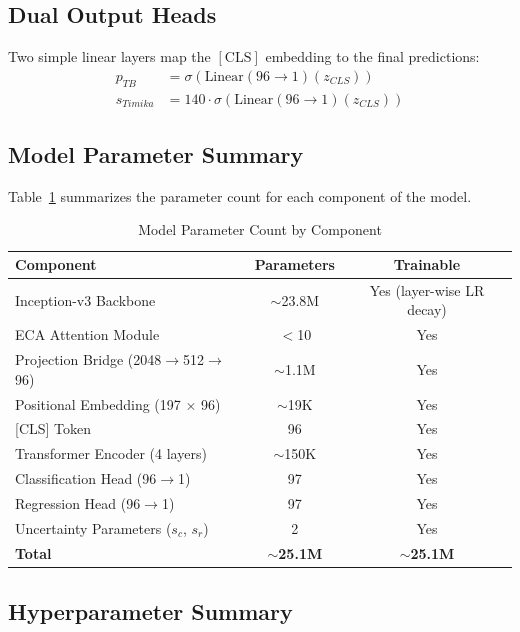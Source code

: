 \documentclass[12pt]{report}
\begin{document}
\subsection{Dual Output Heads}
Two simple linear layers map the $[\text{CLS}]$ embedding to the final predictions:
\begin{align}
p_{TB} &= \sigma(\text{Linear}(96 \to 1)(z_{CLS})) \\
s_{Timika} &= 140 \cdot \sigma(\text{Linear}(96 \to 1)(z_{CLS}))
\end{align}

\subsection{Model Parameter Summary}

Table~\ref{tab:params} summarizes the parameter count for each component of the model.

\begin{table}[H]
\centering
\caption{Model Parameter Count by Component}
\label{tab:params}
\renewcommand{\arraystretch}{1.2}
\begin{tabular}{|l|c|c|}
\hline
\textbf{Component} & \textbf{Parameters} & \textbf{Trainable} \\
\hline
Inception-v3 Backbone & $\sim$23.8M & Yes (layer-wise LR decay) \\
ECA Attention Module & $<$10 & Yes \\
Projection Bridge (2048$\to$512$\to$96) & $\sim$1.1M & Yes \\
Positional Embedding (197 $\times$ 96) & $\sim$19K & Yes \\
{[CLS]} Token & 96 & Yes \\
Transformer Encoder (4 layers) & $\sim$150K & Yes \\
Classification Head (96$\to$1) & 97 & Yes \\
Regression Head (96$\to$1) & 97 & Yes \\
Uncertainty Parameters ($s_c$, $s_r$) & 2 & Yes \\
\hline
\textbf{Total} & \textbf{$\sim$25.1M} & \textbf{$\sim$25.1M} \\
\hline
\end{tabular}
\end{table}

\subsection{Hyperparameter Summary}
\end{document}
